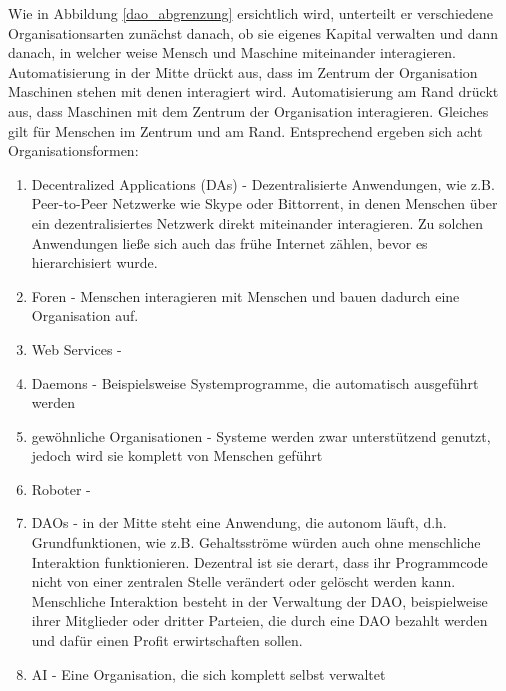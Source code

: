 Wie in Abbildung \ref{dao_abgrenzung} ersichtlich wird, unterteilt er verschiedene Organisationsarten zunächst danach, ob sie eigenes Kapital verwalten und dann danach, in welcher weise Mensch und Maschine miteinander interagieren. Automatisierung in der Mitte drückt aus, dass im Zentrum der Organisation Maschinen stehen mit denen interagiert wird. Automatisierung am Rand drückt aus, dass Maschinen mit dem Zentrum der Organisation interagieren. Gleiches gilt für Menschen im Zentrum und am Rand. Entsprechend ergeben sich acht Organisationsformen:
\begin{enumerate}
	\item Decentralized Applications (DAs) - Dezentralisierte Anwendungen, wie z.B. Peer-to-Peer Netzwerke wie Skype oder Bittorrent, in denen Menschen über ein dezentralisiertes Netzwerk direkt miteinander interagieren. Zu solchen Anwendungen ließe sich auch das frühe Internet zählen, bevor es hierarchisiert wurde.
	\item Foren - Menschen interagieren mit Menschen und bauen dadurch eine Organisation auf.
	\item Web Services - 
	\item Daemons - Beispielsweise Systemprogramme, die automatisch ausgeführt werden
	\item gewöhnliche Organisationen - Systeme werden zwar unterstützend genutzt, jedoch wird sie komplett von Menschen geführt
	\item Roboter - 
	\item DAOs - in der Mitte steht eine Anwendung, die autonom läuft, d.h. Grundfunktionen, wie z.B. Gehaltsströme würden auch ohne menschliche Interaktion funktionieren. Dezentral ist sie derart, dass ihr Programmcode nicht von einer zentralen Stelle verändert oder gelöscht werden kann. Menschliche Interaktion besteht in der Verwaltung der DAO, beispielweise ihrer Mitglieder oder dritter Parteien, die durch eine DAO bezahlt werden und dafür einen Profit erwirtschaften sollen.
	\item AI - Eine Organisation, die sich komplett selbst verwaltet
	
\end{enumerate}
